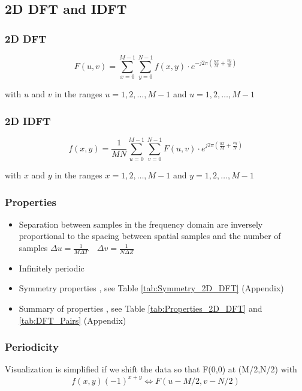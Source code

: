   

\subsection{2D DFT and IDFT }

\subsubsection{2D DFT}
\begin{equation}
    F(u,v) = \sum_{x=0}^{M-1}\sum_{y=0}^{N-1}f(x,y)\cdot e^{-j2\pi \left(\frac{ux}{M}+ \frac{vy}{N}\right)}
\end{equation}
\begin{center}
  with $u$ and $v$ in the ranges $u = 1,2,\ldots,M-1$ and $u = 1,2,\ldots,M-1$
\end{center}
\subsubsection{2D IDFT}
\begin{equation}
    f(x,y) = \frac{1}{MN} \sum_{u=0}^{M-1}\sum_{v=0}^{N-1}F(u,v)\cdot e^{j2\pi \left(\frac{ux}{M}+ \frac{vy}{N}\right)}
\end{equation}
\begin{center}
  with $x$ and $y$ in the ranges $x = 1,2,\ldots,M-1$ and $y = 1,2,\ldots,M-1$
\end{center}

\subsubsection{Properties}
\begin{itemize}
\item Separation between samples in the frequency domain are inversely proportional to the spacing between spatial samples and the number of samples
$\Delta u = \frac{1}{M \Delta T} \quad \Delta v = \frac{1}{N \Delta Z}$
\item Infinitely periodic
\item Symmetry properties , see Table \ref{tab:Symmetry_2D_DFT} (Appendix)
\item Summary of properties , see Table \ref{tab:Properties_2D_DFT} and \ref{tab:DFT_Pairs} (Appendix)
\end{itemize}

\subsubsection{Periodicity }
  Visualization is simplified if we shift the data so that F(0,0) at (M/2,N/2) with
    \begin{equation}
      f(x,y)(-1)^{x+y} \Leftrightarrow F(u-M/2, v-N/2)
    \end{equation}
    
